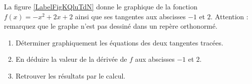 
\begin{exercice}\label{exosmath-0397}

La figure \ref{LabelFigKQluTdN} donne le graphique de la fonction \( f(x)=-x^2+2x+2\) ainsi que ses tangentes aux abscisses \( -1\) et \( 2\). Attention : remarquez que le graphe n'est pas dessiné dans un repère orthonormé.

\newcommand{\CaptionFigKQluTdN}{Le graphe de la fonction \( f(x)=-x^2+2x+2\) pour l'exercice \ref{exosmath-0397}.}


\begin{enumerate}
    \item
        Déterminer graphiquement les équations des deux tangentes tracées.
    \item
        En déduire la valeur de la dérivée de \( f\) aux abscisses \( -1\) et \( 2\).
    \item
        Retrouver les résultats par le calcul.
\end{enumerate}

\end{exercice}
